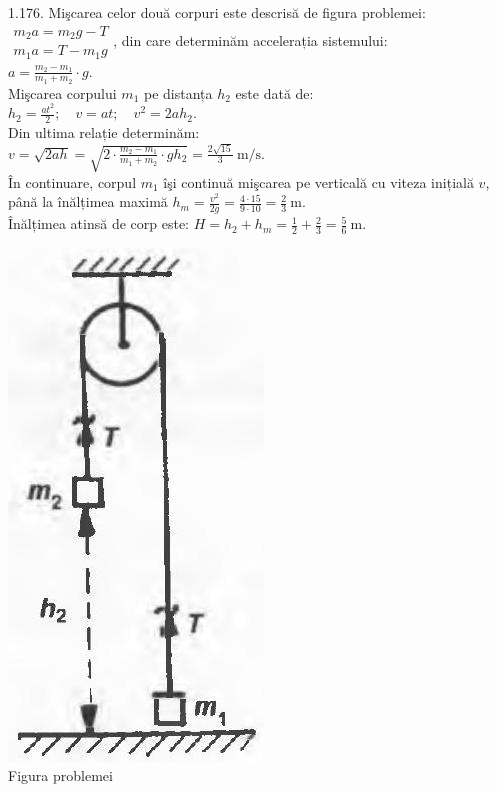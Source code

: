 1.176. Mişcarea celor două corpuri este descrisă de figura problemei:\\ $\begin{array}{ll} m_{2} a=m_{2} g-T\\ m_{1} a=T-m_{1} g \end{array}$, din care determinăm accelerația sistemului:\\ $a=\frac{m_{2}-m_{1}}{m_{1}+m_{2}} \cdot g$.\\ Mişcarea corpului $m_{1}$ pe distanța $h_{2}$ este dată de:\\ $h_{2}=\frac{a t^{2}}{2}; \quad v=a t; \quad v^{2}=2 a h_{2}$.\\ Din ultima relație determinăm:\\ $v=\sqrt{2 a h}=\sqrt{2 \cdot \frac{m_{2}-m_{1}}{m_{1}+m_{2}} \cdot g h_{2}}=\frac{2 \sqrt{15}}{3} \mathrm{~m} / \mathrm{s}$.\\ În continuare, corpul $m_{1}$ îşi continuă mişcarea pe verticală cu viteza inițială $v$, până la înălțimea maximă $h_{m}=\frac{v^{2}}{2 g}=\frac{4 \cdot 15}{9 \cdot 10}=\frac{2}{3} \mathrm{~m}$.\\ Înălțimea atinsă de corp este: $H=h_{2}+h_{m}=\frac{1}{2}+\frac{2}{3}=\frac{5}{6} \mathrm{~m}$.\\ \begin{center} \includegraphics[width=0.4\linewidth]{images/2025_07_01_5b3ff9fa0d508c8e9f17g-237}\\ Figura problemei \end{center}\\

